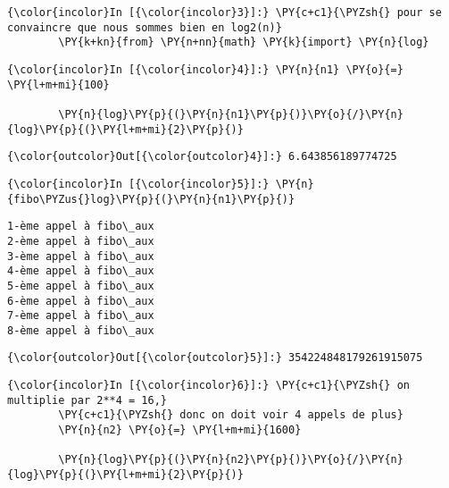     \begin{Verbatim}[commandchars=\\\{\}]
{\color{incolor}In [{\color{incolor}3}]:} \PY{c+c1}{\PYZsh{} pour se convaincre que nous sommes bien en log2(n)}
        \PY{k+kn}{from} \PY{n+nn}{math} \PY{k}{import} \PY{n}{log}
\end{Verbatim}


    \begin{Verbatim}[commandchars=\\\{\}]
{\color{incolor}In [{\color{incolor}4}]:} \PY{n}{n1} \PY{o}{=} \PY{l+m+mi}{100}
        
        \PY{n}{log}\PY{p}{(}\PY{n}{n1}\PY{p}{)}\PY{o}{/}\PY{n}{log}\PY{p}{(}\PY{l+m+mi}{2}\PY{p}{)}
\end{Verbatim}


\begin{Verbatim}[commandchars=\\\{\}]
{\color{outcolor}Out[{\color{outcolor}4}]:} 6.643856189774725
\end{Verbatim}
            
    \begin{Verbatim}[commandchars=\\\{\}]
{\color{incolor}In [{\color{incolor}5}]:} \PY{n}{fibo\PYZus{}log}\PY{p}{(}\PY{n}{n1}\PY{p}{)}
\end{Verbatim}


    \begin{Verbatim}[commandchars=\\\{\}]
1-ème appel à fibo\_aux
2-ème appel à fibo\_aux
3-ème appel à fibo\_aux
4-ème appel à fibo\_aux
5-ème appel à fibo\_aux
6-ème appel à fibo\_aux
7-ème appel à fibo\_aux
8-ème appel à fibo\_aux

    \end{Verbatim}

\begin{Verbatim}[commandchars=\\\{\}]
{\color{outcolor}Out[{\color{outcolor}5}]:} 354224848179261915075
\end{Verbatim}
            
    \begin{Verbatim}[commandchars=\\\{\}]
{\color{incolor}In [{\color{incolor}6}]:} \PY{c+c1}{\PYZsh{} on multiplie par 2**4 = 16,}
        \PY{c+c1}{\PYZsh{} donc on doit voir 4 appels de plus}
        \PY{n}{n2} \PY{o}{=} \PY{l+m+mi}{1600}
        
        \PY{n}{log}\PY{p}{(}\PY{n}{n2}\PY{p}{)}\PY{o}{/}\PY{n}{log}\PY{p}{(}\PY{l+m+mi}{2}\PY{p}{)}
\end{Verbatim}


